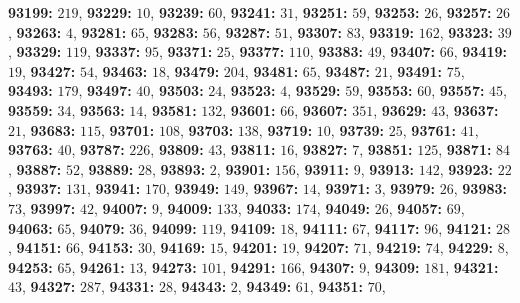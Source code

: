 \textsf{\bfseries 93199:} $219$, \textsf{\bfseries 93229:} $10$, \textsf{\bfseries 93239:} $60$, \textsf{\bfseries 93241:} $31$, \textsf{\bfseries 93251:} $59$, \textsf{\bfseries 93253:} $26$, \textsf{\bfseries 93257:} $26$, \textsf{\bfseries 93263:} $4$, \textsf{\bfseries 93281:} $65$, \textsf{\bfseries 93283:} $56$, \textsf{\bfseries 93287:} $51$, \textsf{\bfseries 93307:} $83$, \textsf{\bfseries 93319:} $162$, \textsf{\bfseries 93323:} $39$, \textsf{\bfseries 93329:} $119$, \textsf{\bfseries 93337:} $95$, \textsf{\bfseries 93371:} $25$, \textsf{\bfseries 93377:} $110$, \textsf{\bfseries 93383:} $49$, \textsf{\bfseries 93407:} $66$, \textsf{\bfseries 93419:} $19$, \textsf{\bfseries 93427:} $54$, \textsf{\bfseries 93463:} $18$, \textsf{\bfseries 93479:} $204$, \textsf{\bfseries 93481:} $65$, \textsf{\bfseries 93487:} $21$, \textsf{\bfseries 93491:} $75$, \textsf{\bfseries 93493:} $179$, \textsf{\bfseries 93497:} $40$, \textsf{\bfseries 93503:} $24$, \textsf{\bfseries 93523:} $4$, \textsf{\bfseries 93529:} $59$, \textsf{\bfseries 93553:} $60$, \textsf{\bfseries 93557:} $45$, \textsf{\bfseries 93559:} $34$, \textsf{\bfseries 93563:} $14$, \textsf{\bfseries 93581:} $132$, \textsf{\bfseries 93601:} $66$, \textsf{\bfseries 93607:} $351$, \textsf{\bfseries 93629:} $43$, \textsf{\bfseries 93637:} $21$, \textsf{\bfseries 93683:} $115$, \textsf{\bfseries 93701:} $108$, \textsf{\bfseries 93703:} $138$, \textsf{\bfseries 93719:} $10$, \textsf{\bfseries 93739:} $25$, \textsf{\bfseries 93761:} $41$, \textsf{\bfseries 93763:} $40$, \textsf{\bfseries 93787:} $226$, \textsf{\bfseries 93809:} $43$, \textsf{\bfseries 93811:} $16$, \textsf{\bfseries 93827:} $7$, \textsf{\bfseries 93851:} $125$, \textsf{\bfseries 93871:} $84$, \textsf{\bfseries 93887:} $52$, \textsf{\bfseries 93889:} $28$, \textsf{\bfseries 93893:} $2$, \textsf{\bfseries 93901:} $156$, \textsf{\bfseries 93911:} $9$, \textsf{\bfseries 93913:} $142$, \textsf{\bfseries 93923:} $22$, \textsf{\bfseries 93937:} $131$, \textsf{\bfseries 93941:} $170$, \textsf{\bfseries 93949:} $149$, \textsf{\bfseries 93967:} $14$, \textsf{\bfseries 93971:} $3$, \textsf{\bfseries 93979:} $26$, \textsf{\bfseries 93983:} $73$, \textsf{\bfseries 93997:} $42$, \textsf{\bfseries 94007:} $9$, \textsf{\bfseries 94009:} $133$, \textsf{\bfseries 94033:} $174$, \textsf{\bfseries 94049:} $26$, \textsf{\bfseries 94057:} $69$, \textsf{\bfseries 94063:} $65$, \textsf{\bfseries 94079:} $36$, \textsf{\bfseries 94099:} $119$, \textsf{\bfseries 94109:} $18$, \textsf{\bfseries 94111:} $67$, \textsf{\bfseries 94117:} $96$, \textsf{\bfseries 94121:} $28$, \textsf{\bfseries 94151:} $66$, \textsf{\bfseries 94153:} $30$, \textsf{\bfseries 94169:} $15$, \textsf{\bfseries 94201:} $19$, \textsf{\bfseries 94207:} $71$, \textsf{\bfseries 94219:} $74$, \textsf{\bfseries 94229:} $8$, \textsf{\bfseries 94253:} $65$, \textsf{\bfseries 94261:} $13$, \textsf{\bfseries 94273:} $101$, \textsf{\bfseries 94291:} $166$, \textsf{\bfseries 94307:} $9$, \textsf{\bfseries 94309:} $181$, \textsf{\bfseries 94321:} $43$, \textsf{\bfseries 94327:} $287$, \textsf{\bfseries 94331:} $28$, \textsf{\bfseries 94343:} $2$, \textsf{\bfseries 94349:} $61$, \textsf{\bfseries 94351:} $70$, 
